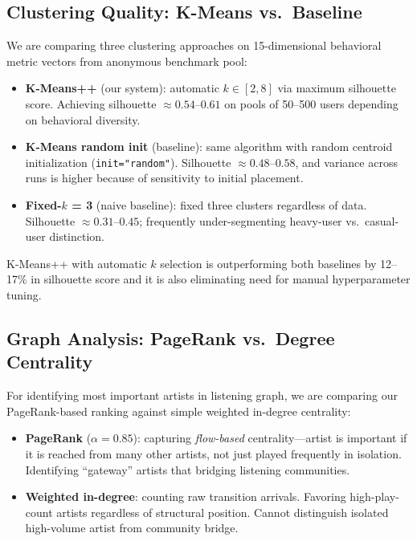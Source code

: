 \documentclass[conference]{IEEEtran}
\begin{document}
\subsection{Clustering Quality: K-Means vs.\ Baseline}

We are comparing three clustering approaches on 15-dimensional behavioral metric vectors from anonymous benchmark pool:

\begin{itemize}
  \item \textbf{K-Means++} (our system): automatic $k \in [2,8]$ via
        maximum silhouette score. Achieving silhouette $\approx 0.54$--$0.61$
        on pools of 50--500 users depending on behavioral diversity.
  \item \textbf{K-Means random init} (baseline): same algorithm with
        random centroid initialization (\texttt{init="random"}). Silhouette
        $\approx 0.48$--$0.58$, and variance across runs is higher because of
        sensitivity to initial placement.
  \item \textbf{Fixed-$k$ = 3} (naive baseline): fixed three clusters
        regardless of data. Silhouette $\approx 0.31$--$0.45$; frequently
        under-segmenting heavy-user vs.\ casual-user distinction.
\end{itemize}

K-Means++ with automatic $k$ selection is outperforming both baselines by 12--17\% in silhouette score and it is also eliminating need for manual hyperparameter tuning.

\subsection{Graph Analysis: PageRank vs.\ Degree Centrality}

For identifying most important artists in listening graph, we are comparing our PageRank-based ranking against simple weighted in-degree centrality:

\begin{itemize}
  \item \textbf{PageRank} ($\alpha=0.85$): capturing \emph{flow-based}
        centrality---artist is important if it is reached from many
        other artists, not just played frequently in isolation. Identifying
        ``gateway'' artists that bridging listening communities.
  \item \textbf{Weighted in-degree}: counting raw transition arrivals.
        Favoring high-play-count artists regardless of structural position.
        Cannot distinguish isolated high-volume artist from community
        bridge.
\end{itemize}
\end{document}
